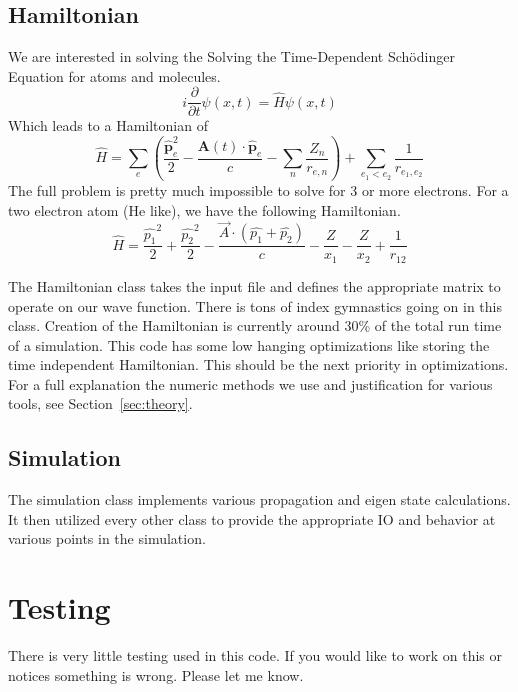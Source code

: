 \documentclass{article}
\begin{document}
\subsection{Hamiltonian} %
\label{sub:hamiltonian}
We are interested in solving the Solving the Time-Dependent Sch\"{o}dinger Equation for atoms and molecules.
\begin{equation}
    i\frac{\partial}{\partial t}\psi(x,t) = \hat{H}\psi(x,t)
\end{equation}
Which leads to a Hamiltonian of
\begin{equation}
    \hat{H} = \sum_{e}\left(\frac{\hat{\mathbf{p}}^2_e}{2} - \frac{\mathbf{A}(t) \cdot \hat{\mathbf{p}}_e}{c} - \sum_{n} \frac{Z_n}{r_{e,n}}\right) + \sum_{e_1 < e_2}\frac{1}{r_{e_1, e_2}}
\end{equation}
The full problem is pretty much impossible to solve for 3 or more electrons. For a two electron atom (He like), we have the following Hamiltonian.
\begin{equation}
  \hat H = \frac{\hat{p_1}^2}{2} + \frac{\hat{p_2}^2}{2} - \frac{\vec{A} \cdot (\hat{p_1}+\hat{p_2})}{c} - \frac{Z}{x_1} - \frac{Z}{x_2} + \frac{1}{r_{12}}
\end{equation}

The Hamiltonian class takes the input file and defines the appropriate matrix to operate on our wave function. There is tons of index gymnastics going on in this class. Creation of the Hamiltonian is currently around 30\% of the total run time of a simulation. This code has some low hanging optimizations like storing the time independent Hamiltonian. This should be the next priority in optimizations. For a full explanation the numeric methods we use and justification for various tools, see Section~\ref{sec:theory}.


\subsection{Simulation} %
\label{sub:simulation}
The simulation class implements various propagation and eigen state calculations. It then utilized every other class to provide the appropriate IO and behavior at various points in the simulation.



\section{Testing} %
\label{sec:testing}
There is very little testing used in this code. If you would like to work on this or notices something is wrong. Please let me know.
\end{document}
